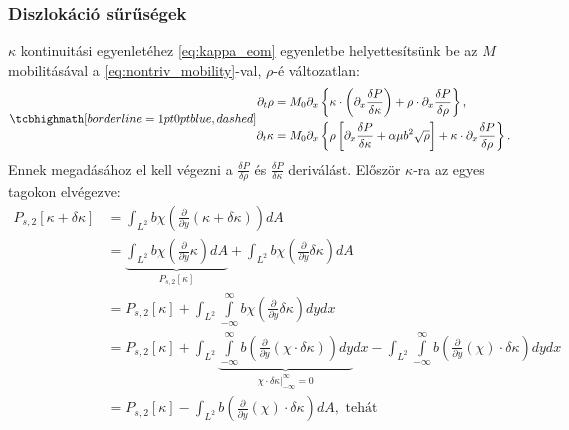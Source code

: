 \documentclass[10pt,a4paper]{scrartcl}
\begin{document}
\subsubsection{Diszlokáció sűrűségek} $\kappa$ kontinuitási egyenletéhez \cref{eq:kappa_eom} egyenletbe helyettesítsünk be az $M$ mobilitásával a \cref{eq:nontriv_mobility}-val, $\rho$-é változatlan:
\begin{gather} \label{eq:rho_kappa_conti}
\tcbhighmath[borderline={1pt}{0pt}{blue,dashed}]{
\begin{aligned}{\partial _t}\rho  &  = {M_0}{\partial _x}\left\{ {\kappa \cdot \left( {{\partial _x}\frac{{\delta P}}{{\delta \kappa }}} \right) + \rho \cdot {\partial _x}\frac{{\delta P}}{{\delta \rho }}} \right\}, \\ 
  {\partial _t}\kappa  &  = {M_0}{\partial _x}\left\{ {\rho \left[ {{\partial _x}\frac{{\delta P}}{{\delta \kappa }} + \alpha \mu {b^2}\sqrt \rho } \right] + \kappa  \cdot {\partial _x}\frac{{\delta P}}{{\delta \rho }}} \right\}.
\end{aligned}}
\end{gather}
Ennek megadásához el kell végezni a $\frac{{\delta P}}{{\delta \rho }}$ és $\frac{{\delta P}}{{\delta \kappa }}$ deriválást. Először $\kappa$-ra az egyes tagokon elvégezve:
\begin{align*}
  {P_{s,2}}\left[ {\kappa  + \delta \kappa } \right] &  = \int_{{L^2}} {b\chi \left( {\frac{\partial }{{\partial y}}\left( {\kappa  + \delta \kappa } \right)} \right)dA}  \\ 
   &  = \underbrace {\int_{{L^2}} {b\chi \left( {\frac{\partial }{{\partial y}}\kappa } \right)dA} }_{{P_{s,2}}\left[ \kappa  \right]} + \int_{{L^2}} {b\chi \left( {\frac{\partial }{{\partial y}}\delta \kappa } \right)dA}  \\ 
   &  = {P_{s,2}}\left[ \kappa  \right] + \int_{{L^2}} {\int\limits_{ - \infty }^\infty  {b\chi \left( {\frac{\partial }{{\partial y}}\delta \kappa } \right)} dy} dx \\ 
   &  = {P_{s,2}}\left[ \kappa  \right] + \int_{{L^2}} {\underbrace {\int\limits_{ - \infty }^\infty  {b\left( {\frac{\partial }{{\partial y}}\left( {\chi  \cdot \delta \kappa } \right)} \right)} dy}_{\left. {\chi  \cdot \delta \kappa } \right|_{ - \infty }^\infty  = 0}} dx - \int_{{L^2}} {\int\limits_{ - \infty }^\infty  {b\left( {\frac{\partial }{{\partial y}}\left( \chi  \right) \cdot \delta \kappa } \right)dy} dx}  \\ 
   &  = {P_{s,2}}\left[ \kappa  \right] - \int_{{L^2}} {b\left( {\frac{\partial }{{\partial y}}\left( \chi  \right) \cdot \delta \kappa } \right)dA}, \text{ tehát}
\end{align*}
\end{document}
